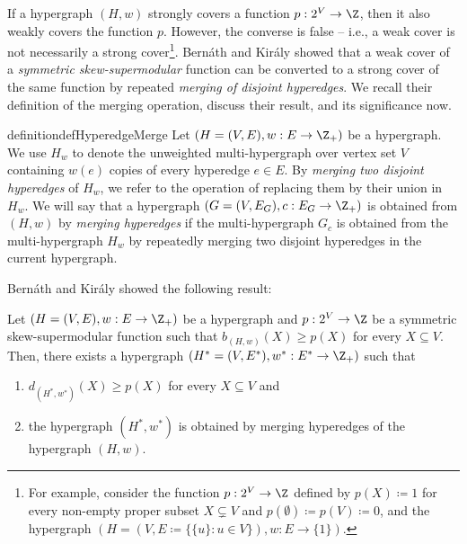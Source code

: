 If a hypergraph $(H, w)$ strongly covers a function $p:2^V\rightarrow \Z$, then it also weakly covers the function $p$. However, the converse is false -- i.e., a weak cover is not necessarily a strong cover\footnote{For example, consider the function $p: 2^V\rightarrow \Z$ defined by $p(X)\coloneqq 1$ for every non-empty proper subset $X\subsetneq V$ and $p(\emptyset)\coloneqq p(V)\coloneqq 0$, and the hypergraph $(H=(V, E\coloneqq \{\{u\}: u\in V\}), w: E\rightarrow \{1\})$.}.  
Bern\'{a}th and Kir\'{a}ly \cite{Bernath-Kiraly} showed 
that a weak cover of a \emph{symmetric skew-supermodular} function can be converted to a strong cover of the same function by repeated \emph{merging of disjoint hyperedges}. 
We recall their definition of the merging operation, discuss their result, and its significance now. 
\begin{restatable}{definition}{defHyperedgeMerge}\label{def:WeakToStrongCover:hyperedge-merge}
Let $(H=(V, E), w: E\rightarrow \Z_+)$ be a hypergraph. 
We use $H_w$ to denote the unweighted multi-hypergraph over vertex set $V$ containing $w(e)$ copies of every hyperedge $e\in E$.  
By \emph{merging two disjoint hyperedges} of $H_w$, we refer to the operation of replacing them by their union in $H_w$. 
We will say that a hypergraph $(G=(V, E_G), c: E_G\rightarrow \Z_+)$ is obtained from $(H, w)$ by \emph{merging hyperedges} if the multi-hypergraph $G_c$ is obtained from the multi-hypergraph $H_w$ by repeatedly merging two disjoint hyperedges in the current hypergraph. 
\end{restatable}
Bern\'{a}th and Kir\'{a}ly showed the following result: 
\begin{theorem}\label{thm:bernath-kiraly}
    Let $(H=(V, E), w: E\rightarrow \Z_+)$ be a hypergraph and $p:2^V\rightarrow \Z$ be a symmetric skew-supermodular function such that 
$b_{(H, w)}(X) \geq p(X)$ for every $X \subseteq V$. 
Then, there exists a hypergraph $\left(H^* = (V, E^*), w^*:E^* \rightarrow\Z_+\right)$ 
such that
\begin{enumerate}[label=$(\arabic*)$]
    \item $d_{(H^*, w^*)}(X) \geq p(X)$ for every $X\subseteq V$ and 
    \item the hypergraph $(H^*,w^*)$ is obtained by merging hyperedges of the hypergraph $(H, w)$.
\end{enumerate}
\end{theorem}

